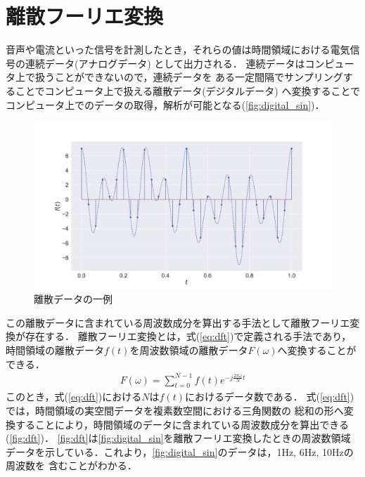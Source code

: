 \section{離散フーリエ変換}

音声や電流といった信号を計測したとき，それらの値は時間領域における電気信号の連続データ(アナログデータ)
として出力される．
連続データはコンピュータ上で扱うことができないので，連続データを
ある一定間隔でサンプリングすることでコンピュータ上で扱える離散データ(デジタルデータ)
へ変換することでコンピュータ上でのデータの取得，解析が可能となる(\autoref{fig:digital_sin})．
\iffigure
\begin{figure}[h]
  \centering
  \includegraphics[clip, width=\textwidth]{figure/sin.pdf}
  \caption{離散データの一例}
  \label{fig:digital_sin}
\end{figure}
\fi

この離散データに含まれている周波数成分を算出する手法として離散フーリエ変換が存在する．
離散フーリエ変換とは，式(\ref{eq:dft})で定義される手法であり，
時間領域の離散データ$f(t)$を周波数領域の離散データ$F(\omega)$へ変換することができる．
\begin{align}
  F(\omega) = \sum_{t=0}^{N-1} f(t) e ^ {-j \frac{2 \pi \omega}{N} t} \label{eq:dft}
\end{align}
このとき，式(\ref{eq:dft})における$N$は$f(t)$におけるデータ数である．
式(\ref{eq:dft})では，時間領域の実空間データを複素数空間における三角関数の
総和の形へ変換することにより，時間領域のデータに含まれている周波数成分を算出できる(\autoref{fig:dft})．
\autoref{fig:dft}は\autoref{fig:digital_sin}を離散フーリエ変換したときの周波数領域
データを示している．これより，\autoref{fig:digital_sin}のデータは，1Hz, 6Hz, 10Hzの周波数を
含むことがわかる．

